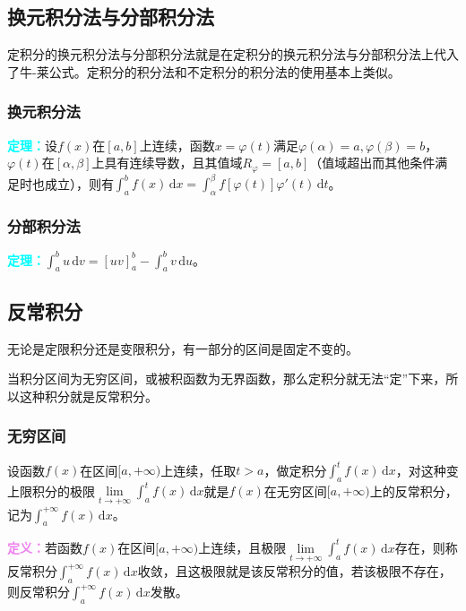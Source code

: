 \documentclass[UTF8, 12pt]{ctexart}
\begin{document}
\subsection{换元积分法与分部积分法}

定积分的换元积分法与分部积分法就是在定积分的换元积分法与分部积分法上代入了牛-莱公式。定积分的积分法和不定积分的积分法的使用基本上类似。

\subsubsection{换元积分法}

\textcolor{aqua}{\textbf{定理：}}设$f(x)$在$[a,b]$上连续，函数$x=\varphi(t)$满足$\varphi(\alpha)=a,\varphi(\beta)=b$，$\varphi(t)$在$[\alpha,\beta]$上具有连续导数，且其值域$R_\varphi=[a,b]$（值域超出而其他条件满足时也成立），则有$\int_a^bf(x)\,\textrm{d}x=\int_\alpha^\beta f[\varphi(t)]\varphi'(t)\,\textrm{d}t$。

\subsubsection{分部积分法}

\textcolor{aqua}{\textbf{定理：}}$\int_a^bu\,\textrm{d}v=[uv]_a^b-\int_a^bv\,\textrm{d}u$。

\subsection{反常积分}

无论是定限积分还是变限积分，有一部分的区间是固定不变的。

当积分区间为无穷区间，或被积函数为无界函数，那么定积分就无法“定”下来，所以这种积分就是反常积分。

\subsubsection{无穷区间}

设函数$f(x)$在区间$[a,+\infty)$上连续，任取$t>a$，做定积分$\int_a^tf(x)\,\textrm{d}x$，对这种变上限积分的极限$\lim\limits_{t\to+\infty}\int_a^tf(x)\,\textrm{d}x$就是$f(x)$在无穷区间$[a,+\infty)$上的反常积分，记为$\int_a^{+\infty}f(x)\,\textrm{d}x$。

\textcolor{violet}{\textbf{定义：}}若函数$f(x)$在区间$[a,+\infty)$上连续，且极限$\lim\limits_{t\to+\infty}\int_a^tf(x)\,\textrm{d}x$存在，则称反常积分$\int_a^{+\infty}f(x)\,\textrm{d}x$收敛，且这极限就是该反常积分的值，若该极限不存在，则反常积分$\int_a^{+\infty}f(x)\,\textrm{d}x$发散。
\end{document}
